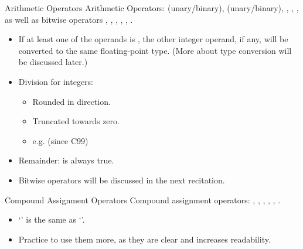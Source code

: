 \documentclass[handout]{beamer}
\begin{document}
\begin{frame}{Arithmetic Operators}
    Arithmetic Operators: \ttt{+} (unary/binary), \ttt{-} (unary/binary), \ttt{*}, \ttt{/}, \ttt{\%}, as well as bitwise operators \ttt{\&}, \ttt{\^{}}, \ttt{|}, \ttt{\~}, \ttt{<<}, \ttt{>>}.
    \begin{itemize}
        \item If at least one of the operands is , the other integer operand, if any, will be converted to the same floating-point type. (More about type conversion will be discussed later.)
        \pause
        \item Division for integers:
        \begin{itemize}
            \item Rounded in  direction. 
            \item Truncated towards zero. 
            \item e.g.  (since C99)
        \end{itemize}
        \item Remainder:  is always true.
        \pause
        \item Bitwise operators will be discussed in the next recitation.
    \end{itemize}
\end{frame}

\begin{frame}{Compound Assignment Operators}
    Compound assignment operators: \ttt{+=}, \ttt{-=}, \ttt{*=}, \ttt{/=}, \ttt{\%=}, \blue{\ttt{<<=}, \ttt{>>=}, \ttt{\&=}, \ttt{|=}, \ttt{\^{}=}}.
    \begin{itemize}
        \item `' is the same as `'.
        \item Practice to use them more, as they are clear and increases readability.
    \end{itemize}
\end{frame}
\end{document}
